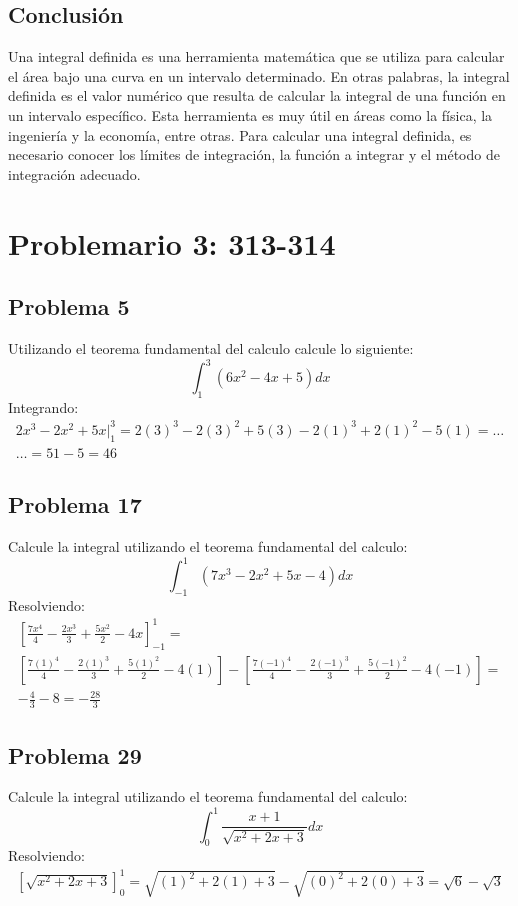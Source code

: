 \documentclass{article}
\begin{document}
\subsection{Conclusión}
Una integral definida es una herramienta matemática que se utiliza para calcular el área bajo una curva en un intervalo determinado. En otras palabras, la integral definida es el valor numérico que resulta de calcular la integral de una función en un intervalo específico. Esta herramienta es muy útil en áreas como la física, la ingeniería y la economía, entre otras. Para calcular una integral definida, es necesario conocer los límites de integración, la función a integrar y el método de integración adecuado.
\section{Problemario 3: 313-314}
\subsection{Problema 5}
Utilizando el teorema fundamental del calculo calcule lo siguiente:
$$
  \int_{1}^{3} (6x^2-4x+5)dx
$$
Integrando:
\begin{align*}
  2x^3 - 2x^2 + 5x|_{1}^{3} = 2(3)^3 -2(3)^2 + 5(3) - 2(1)^3 +2(1)^2 - 5(1) = \dots \\ \dots = 51 - 5 = 46
\end{align*}
\subsection{Problema 17}
Calcule la integral utilizando el teorema fundamental del calculo:
$$
  \int_{-1}^{1}(7x^3-2x^2+5x-4)dx
$$
Resolviendo:
\begin{align*}
  \left[\frac{7x^4}{4}-\frac{2x^3}{3}+\frac{5x^2}{2}-4x\right]_{-1}^{1} = \\ \left[\frac{7(1)^4}{4}-\frac{2(1)^3}{3}+\frac{5(1)^2}{2}-4(1)\right] - \left[\frac{7(-1)^4}{4}-\frac{2(-1)^3}{3}+\frac{5(-1)^2}{2}-4(-1)\right] = \\ -\frac{4}{3} - 8 = -\frac{28}{3}
\end{align*}
\subsection{Problema 29}
Calcule la integral utilizando el teorema fundamental del calculo:
$$
  \int_{0}^{1}\frac{x+1}{\sqrt{x^2+2x+3}}dx
$$
Resolviendo:
\begin{align*}
  \left[\sqrt{x^2+2x+3}\right]_{0}^{1} = \sqrt{(1)^2+2(1)+3} - \sqrt{(0)^2+2(0)+3} = \sqrt{6}-\sqrt{3}
\end{align*}
\end{document}
